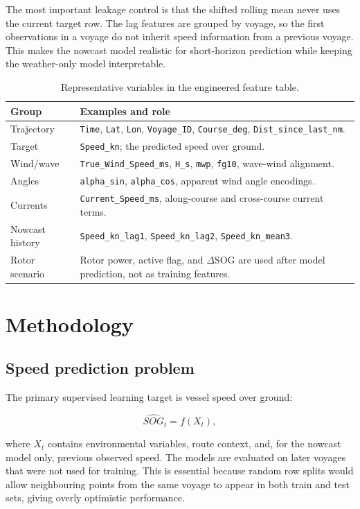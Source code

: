 \documentclass[10pt,a4paper]{article}
\newcommand{\sog}{SOG}
\begin{document}
The most important leakage control is that the shifted rolling mean never uses
the current target row. The lag features are grouped by voyage, so the first
observations in a voyage do not inherit speed information from a previous
voyage. This makes the nowcast model realistic for short-horizon prediction
while keeping the weather-only model interpretable.

\begin{table}[H]
\centering
\caption{Representative variables in the engineered feature table.}
\begin{tabularx}{\textwidth}{>{\raggedright\arraybackslash}p{}X}
\toprule
\textbf{Group} & \textbf{Examples and role} \\
\midrule
Trajectory & \texttt{Time}, \texttt{Lat}, \texttt{Lon}, \texttt{Voyage\_ID}, \texttt{Course\_deg}, \texttt{Dist\_since\_last\_nm}. \\
Target & \texttt{Speed\_kn}; the predicted speed over ground. \\
Wind/wave & \texttt{True\_Wind\_Speed\_ms}, \texttt{H\_s}, \texttt{mwp}, \texttt{fg10}, wave-wind alignment. \\
Angles & \texttt{alpha\_sin}, \texttt{alpha\_cos}, apparent wind angle encodings. \\
Currents & \texttt{Current\_Speed\_ms}, along-course and cross-course current terms. \\
Nowcast history & \texttt{Speed\_kn\_lag1}, \texttt{Speed\_kn\_lag2}, \texttt{Speed\_kn\_mean3}. \\
Rotor scenario & Rotor power, active flag, and $\Delta$\sog{} are used after model prediction, not as training features. \\
\bottomrule
\end{tabularx}
\end{table}

\section{Methodology}

\subsection{Speed prediction problem}

The primary supervised learning target is vessel speed over ground:

\[
\widehat{\sog}_t = f(X_t),
\]

where $X_t$ contains environmental variables, route context, and, for the
nowcast model only, previous observed speed. The models are evaluated on later
voyages that were not used for training. This is essential because random row
splits would allow neighbouring points from the same voyage to appear in both
train and test sets, giving overly optimistic performance.
\end{document}

